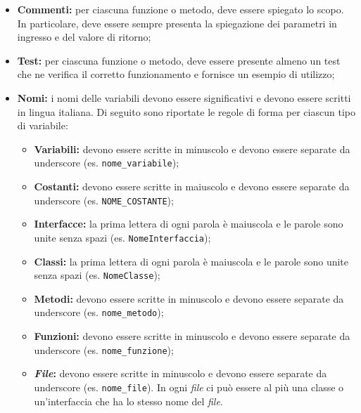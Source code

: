 \begin{itemize}
	\item \textbf{Commenti:} per ciascuna funzione o metodo, deve essere
	      spiegato lo scopo. In particolare, deve essere sempre presenta la
	      spiegazione dei parametri in ingresso e del valore di ritorno;

	\item \textbf{Test:} per ciascuna funzione o metodo, deve essere presente
	      almeno un test che ne verifica il corretto funzionamento e fornisce un
	      esempio di utilizzo;

	\item \textbf{Nomi:} i nomi delle variabili devono essere significativi e
	      devono essere scritti in lingua italiana. Di seguito sono riportate
	      le regole di forma per ciascun tipo di variabile:
	      \begin{itemize}
		      \item \textbf{Variabili:} devono essere scritte in minuscolo e
		            devono essere separate da underscore (es.
		            \texttt{nome\_variabile});

		      \item \textbf{Costanti:} devono essere scritte in maiuscolo e
		            devono essere separate da underscore (es.
		            \texttt{NOME\_COSTANTE});

		      \item \textbf{Interfacce:} la prima lettera di ogni parola è
		            maiuscola e le parole sono unite senza spazi (es.
		            \texttt{NomeInterfaccia});

		      \item \textbf{Classi:} la prima lettera di ogni parola è
		            maiuscola e le parole sono unite senza spazi (es.
		            \texttt{NomeClasse});

		      \item \textbf{Metodi:} devono essere scritte in minuscolo e
		            devono essere separate da underscore (es.
		            \texttt{nome\_metodo});

		      \item \textbf{Funzioni:} devono essere scritte in minuscolo e
		            devono essere separate da underscore (es.
		            \texttt{nome\_funzione});

		      \item \textbf{\textit{File}:} devono essere scritte in minuscolo e
		            devono essere separate da underscore (es.
		            \texttt{nome\_file}). In ogni \textit{file} ci può essere al
		            più una classe o un'interfaccia che ha lo stesso nome del
		            \textit{file}.
	      \end{itemize}
\end{itemize}

